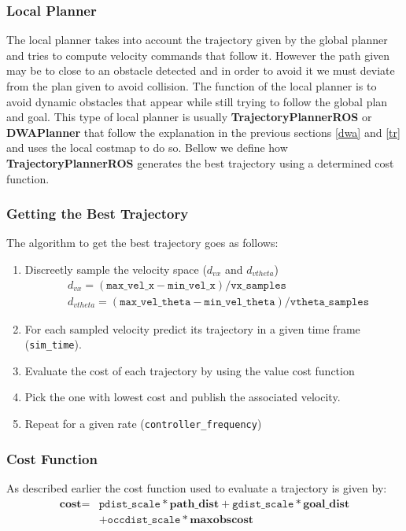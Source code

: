 \subsubsection{Local Planner}
The local planner takes into account the trajectory given by the global planner and tries to compute velocity commands that follow it. However the path given may be to close to an obstacle detected and in order to avoid it we must deviate from the plan given to avoid collision. The function of the local planner is to avoid dynamic obstacles that appear while still trying to follow the global plan and goal. This type of local planner is usually \textbf{TrajectoryPlannerROS} or \textbf{DWAPlanner} that follow the explanation in the previous sections \ref{dwa} and \ref{tr} and uses the local costmap to do so. Bellow we define how \textbf{TrajectoryPlannerROS} generates the best trajectory using a determined cost function.

\subsubsection*{Getting the Best Trajectory}
The algorithm to get the best trajectory goes as follows:
\begin{enumerate}
    \item Discreetly sample the velocity space ($d_{vx}$ and $d_{vtheta}$)
    \begin{align*}
        & d_{vx}=(\texttt{max\_vel\_x}-\texttt{min\_vel\_x})/\texttt{vx\_samples}\\
         & d_{vtheta}=(\texttt{max\_vel\_theta}-\texttt{min\_vel\_theta})/\texttt{vtheta\_samples}
    \end{align*}
    \item For each sampled velocity predict its trajectory in a given time frame (\texttt{sim\_time}).
    \item Evaluate the cost of each trajectory  by using the value cost function
    \item Pick the one with lowest cost and publish the associated velocity.
    \item Repeat for a given rate (\texttt{controller\_frequency})
\end{enumerate}
\subsubsection*{Cost Function}
As described earlier the cost function used to evaluate a trajectory is given by:
\begin{align*}
        \textbf{cost} = &
   \texttt{pdist\_scale} * \textbf{path\_dist}
   + \texttt{gdist\_scale} * \textbf{goal\_dist}\\
   &+\texttt{occdist\_scale} * \textbf{maxobscost} 
\end{align*}

